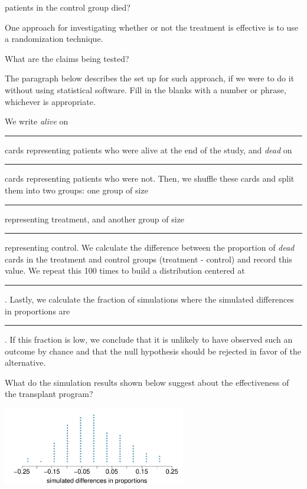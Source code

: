 {\begin{parts}
patients in the control group died?
\item One approach for investigating whether or not the treatment is effective 
is to use a randomization technique.
\begin{subparts}
\item What are the claims being tested?
\item The paragraph below describes the set up for such approach, if we were 
to do it without using statistical software. Fill in the blanks with a number 
or phrase, whichever is appropriate.
\begin{adjustwidth}{2em}{2em}
We write \textit{alive} on \rule{2cm}{0.5pt} cards representing patients who were 
alive at the end of the study, and \textit{dead} on \rule{2cm}{0.5pt} cards 
representing patients who were not. Then, we shuffle these cards and split them 
into two groups: one group of size \rule{2cm}{0.5pt} representing treatment, and 
another group of size \rule{2cm}{0.5pt} representing control. We calculate the 
difference between the proportion of \textit{dead} cards in the treatment and 
control groups (treatment - control) and record this value. We repeat this 100 
times to build a distribution centered at \rule{2cm}{0.5pt}. Lastly, we calculate 
the fraction of simulations where the simulated differences in proportions are 
\rule{2cm}{0.5pt}. If this fraction is low, we conclude that it is unlikely to 
have observed such an outcome by chance and that the null hypothesis should 
be rejected in favor of the alternative.
\end{adjustwidth}
\item What do the simulation results shown below suggest about the effectiveness 
of the transplant program?
\end{subparts}
\end{parts}
\begin{center}
\includegraphics[width= 0.6\textwidth]{ch_intro_to_data/figures/eoce/randomization_heart_transplants/randomization_heart_transplants_rando.pdf}
\end{center}
}{}
